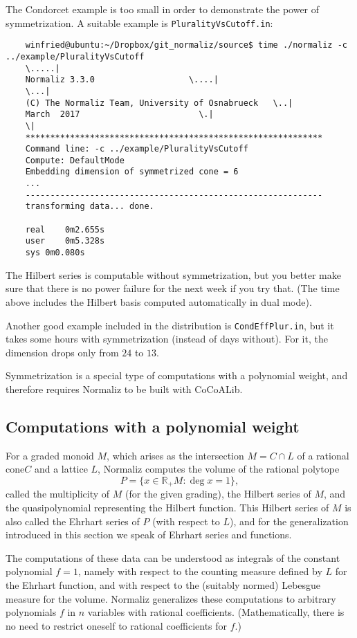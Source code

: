 \documentclass[12pt,a4paper]{scrartcl}
\theoremstyle{definition}
\def\RR{{\mathbb R}}
\begin{document}
{	The Condorcet example is too small in order to demonstrate the power of symmetrization. A suitable example is \verb|PluralityVsCutoff.in|:
	\begin{Verbatim}
	winfried@ubuntu:~/Dropbox/git_normaliz/source$ time ./normaliz -c ../example/PluralityVsCutoff
	\.....|
	Normaliz 3.3.0                   \....|
	\...|
	(C) The Normaliz Team, University of Osnabrueck   \..|
	March  2017                        \.|
	\|
	************************************************************
	Command line: -c ../example/PluralityVsCutoff 
	Compute: DefaultMode 
	Embedding dimension of symmetrized cone = 6
	...
	------------------------------------------------------------
	transforming data... done.
	
	real	0m2.655s
	user	0m5.328s
	sys	0m0.080s
	\end{Verbatim}
	The Hilbert series is computable without symmetrization, but you better make sure that there is no power failure for the next week if you try that. (The time above includes the Hilbert basis computed automatically in dual mode).
	
	Another good example included in the distribution is \verb|CondEffPlur.in|, but it takes some hours with symmetrization (instead of days without). For it, the dimension drops only from $24$ to $13$.
	
	Symmetrization is a special type of computations with a polynomial weight, and therefore requires Normaliz to be built with CoCoALib. 
	
	\subsection{Computations with a polynomial weight}\label{Poly_comp}
	
	For a graded monoid $M$, which arises as the intersection $M=C\cap L$ of a rational cone$C$  and a lattice $L$,  Normaliz computes the volume of
	the rational polytope
	$$
	P=\{x\in \RR_+ M: \deg x=1\},
	$$
	called the multiplicity of $M$ (for the given grading), the  Hilbert series of $M$, and the quasipolynomial representing the Hilbert function. This Hilbert series of $M$ is also called the Ehrhart series of $P$ (with respect to $L$), and for the generalization introduced in this section we speak of Ehrhart series and functions.
	
	The computations of these data can be understood as integrals of the
	constant polynomial $f=1$, namely with respect to the counting
	measure defined by $L$ for the Ehrhart function, and with
	respect to the (suitably normed) Lebesgue measure for the
	volume. Normaliz generalizes these computations to
	arbitrary polynomials $f$ in $n$ variables with rational
	coefficients. (Mathematically, there is no need to restrict
	oneself to rational coefficients for $f$.)
	
}
\end{document}
